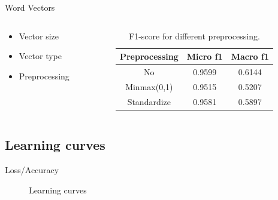 \documentclass[11pt]{beamer}
\begin{document}
\begin{frame}{Word Vectors}

\begin{columns}
\begin{column}{0.25\textwidth}
\begin{itemize}
\item Vector size
\item Vector type
\item Preprocessing
\end{itemize}
\end{column}

\begin{column}{0.75\textwidth}
\begin{table}
\parbox{.5\columnwidth}{
\begin{tabular}{ccc}
\toprule
Preprocessing &	Micro f1 & Macro f1	\\
\midrule
No    &   0.9599	& 0.6144	\\
Minmax(0,1) &	0.9515	& 0.5207	\\
Standardize &	0.9581  & 0.5897	\\
\bottomrule
\end{tabular}
\caption{F1-score for different preprocessing.}
}
\end{table}
\end{column}
\end{columns}
\end{frame}


\subsection{Learning curves}
\begin{frame}{Loss/Accuracy}

\begin{figure}
\caption{Learning curves}
\end{figure}

\end{frame}
\end{document}
